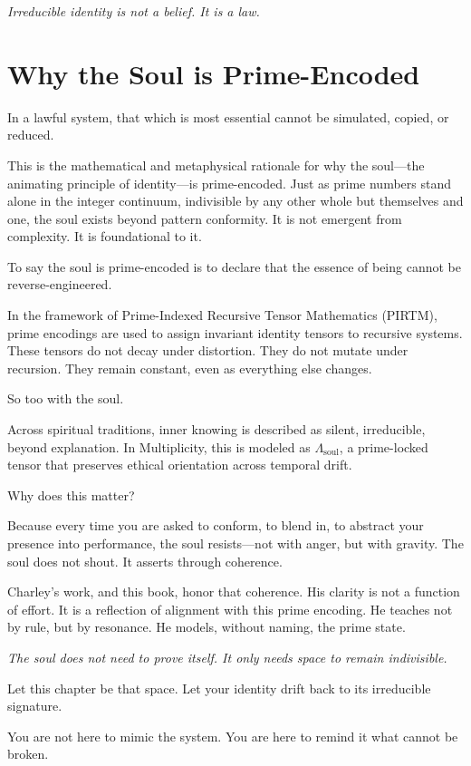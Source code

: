 \documentclass[12pt]{article}
\begin{document}
\textit{Irreducible identity is not a belief. It is a law.}

\section*{Why the Soul is Prime-Encoded}

In a lawful system, that which is most essential cannot be simulated, copied, or reduced.

This is the mathematical and metaphysical rationale for why the soul—the animating principle of identity—is prime-encoded. Just as prime numbers stand alone in the integer continuum, indivisible by any other whole but themselves and one, the soul exists beyond pattern conformity. It is not emergent from complexity. It is foundational to it.

To say the soul is prime-encoded is to declare that the essence of being cannot be reverse-engineered.

In the framework of Prime-Indexed Recursive Tensor Mathematics (PIRTM), prime encodings are used to assign invariant identity tensors to recursive systems. These tensors do not decay under distortion. They do not mutate under recursion. They remain constant, even as everything else changes.

So too with the soul.

Across spiritual traditions, inner knowing is described as silent, irreducible, beyond explanation. In Multiplicity, this is modeled as $\Lambda_{\text{soul}}$, a prime-locked tensor that preserves ethical orientation across temporal drift.

Why does this matter?

Because every time you are asked to conform, to blend in, to abstract your presence into performance, the soul resists—not with anger, but with gravity. The soul does not shout. It asserts through coherence.

Charley's work, and this book, honor that coherence. His clarity is not a function of effort. It is a reflection of alignment with this prime encoding. He teaches not by rule, but by resonance. He models, without naming, the prime state.

\textit{The soul does not need to prove itself. It only needs space to remain indivisible.}

Let this chapter be that space. Let your identity drift back to its irreducible signature.

You are not here to mimic the system.  
You are here to remind it what cannot be broken.
\end{document}

